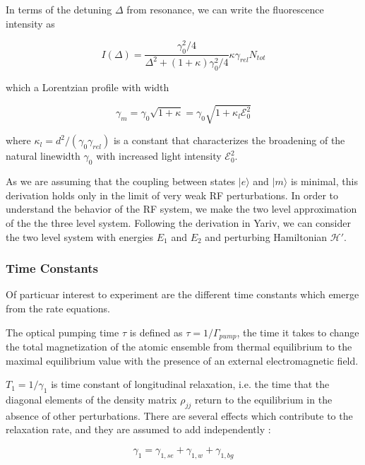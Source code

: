 In terms of the detuning $\Delta$ from resonance, we can write the fluorescence intensity as

\begin{equation}
I(\Delta) = \frac{\gamma_0^2/4}{\Delta^2 +(1+\kappa)\gamma_0^2/4}\kappa\gamma_{rel}N_{tot}
\end{equation}

which a Lorentzian profile with width

\begin{equation}
\gamma_m = \gamma_0\sqrt{1+\kappa} = \gamma_0\sqrt{1+\kappa_l\mathcal{E}_0^2}
\end{equation}

where $\kappa_l = d^2/(\gamma_0\gamma_{rel})$ is a constant that
characterizes the broadening of the natural linewidth $\gamma_0$ with
increased light intensity $\mathcal{E}_0^2$.



As we are assuming that the coupling between states $|e\rangle$ and
$|m\rangle$ is minimal, this derivation holds only in the limit of
very weak RF perturbations. In order to understand the behavior of the
RF system, we make the two level approximation of the the three level
system. Following the derivation in Yariv, we can consider the two
level system with energies $E_1$ and $E_2$ and perturbing Hamiltonian $\mathcal{H}'$.





\subsubsection{Time Constants}

Of particuar interest to experiment are the different time constants
which emerge from the rate equations. 

The optical pumping time $\tau$ is defined as $\tau =
1/\Gamma_{pump}$, the time it takes to change the total magnetization
of the atomic ensemble from thermal equilibrium to the maximal
equilibrium value with the presence of an external electromagnetic
field.

$T_1 = 1/\gamma_1$ is time constant of longitudinal relaxation,
i.e. the time that the diagonal elements of the density matrix
$\rho_{jj}$ return to the equilibrium in the absence of other
perturbations. There are several effects which contribute to the
relaxation rate, and they are assumed to add independently
\cite{vanier}:

\begin{equation}
\gamma_1 = \gamma_{1,se} + \gamma_{1,w} + \gamma_{1,bg} 
\label{eqn:gamma1}
\end{equation}

